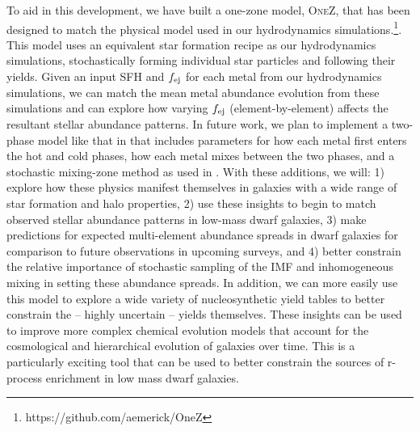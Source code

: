To aid in this development, we have built a one-zone model, \textsc{OneZ}, that has been designed to match the physical model used in our hydrodynamics simulations.\footnote{https://github.com/aemerick/OneZ}. This model uses an equivalent star formation recipe as our hydrodynamics simulations, stochastically forming individual star particles and following their yields. Given an input SFH and $f_{\rm ej}$ for each metal from our hydrodynamics simulations, we can match the mean metal abundance evolution from these simulations and can explore how varying $f_{\rm ej}$ (element-by-element) affects the resultant stellar abundance patterns. In future work, we plan to implement a two-phase model like that in \cite{SchonrichWeinberg2019} that includes parameters for how each metal first enters the hot and cold phases, how each metal mixes between the two phases, and a stochastic mixing-zone method as used in \cite{Cescutti2008}. With these additions, we will: 1) explore how these physics manifest themselves in galaxies with a wide range of star formation and halo properties, 2) use these insights to begin to match observed stellar abundance patterns in low-mass dwarf galaxies, 3) make predictions for expected multi-element abundance spreads in dwarf galaxies for comparison to future observations in upcoming surveys, and 4) better constrain the relative importance of stochastic sampling of the IMF and inhomogeneous mixing in setting these abundance spreads. In addition, we can more easily use this model to explore a wide variety of nucleosynthetic yield tables to better constrain the -- highly uncertain -- yields themselves. These insights can be used to improve more complex chemical evolution models that account for the cosmological and hierarchical evolution of galaxies over time. This is a particularly exciting tool that can be used to better constrain the sources of r-process enrichment in low mass dwarf galaxies.

